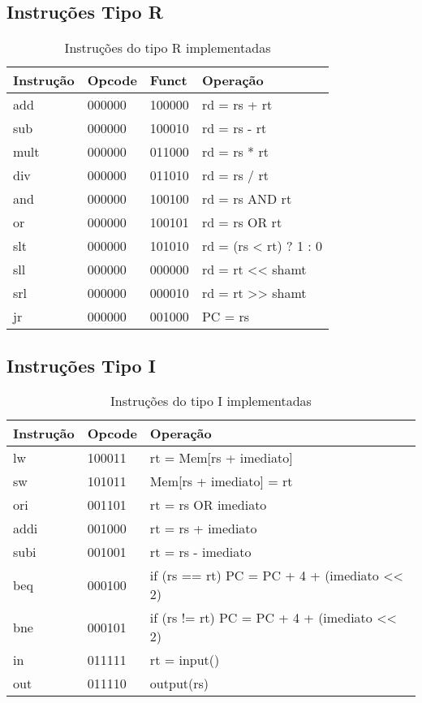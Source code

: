 \documentclass[
	12pt,				%
	oneside,
	a4paper,			%
	english,			%
	french,				%
	spanish,			%
	brazil,				%
	]{abntex2}
\begin{document}
\subsection{Instruções Tipo R}

\begin{table}[H]
\centering
\caption{Instruções do tipo R implementadas}
\begin{tabular}{|l|l|l|l|}
\hline
\textbf{Instrução} & \textbf{Opcode} & \textbf{Funct} & \textbf{Operação} \\
\hline
add & 000000 & 100000 & rd = rs + rt \\
\hline
sub & 000000 & 100010 & rd = rs - rt \\
\hline
mult & 000000 & 011000 & rd = rs * rt \\
\hline
div & 000000 & 011010 & rd = rs / rt \\
\hline
and & 000000 & 100100 & rd = rs AND rt \\
\hline
or & 000000 & 100101 & rd = rs OR rt \\
\hline
slt & 000000 & 101010 & rd = (rs < rt) ? 1 : 0 \\
\hline
sll & 000000 & 000000 & rd = rt << shamt \\
\hline
srl & 000000 & 000010 & rd = rt >> shamt \\
\hline
jr & 000000 & 001000 & PC = rs \\
\hline
\end{tabular}
\end{table}

\subsection{Instruções Tipo I}

\begin{table}[H]
\centering
\caption{Instruções do tipo I implementadas}
\begin{tabular}{|l|l|l|}
\hline
\textbf{Instrução} & \textbf{Opcode} & \textbf{Operação} \\
\hline
lw & 100011 & rt = Mem[rs + imediato] \\
\hline
sw & 101011 & Mem[rs + imediato] = rt \\
\hline
ori & 001101 & rt = rs OR imediato \\
\hline
addi & 001000 & rt = rs + imediato \\
\hline
subi & 001001 & rt = rs - imediato \\
\hline
beq & 000100 & if (rs == rt) PC = PC + 4 + (imediato << 2) \\
\hline
bne & 000101 & if (rs != rt) PC = PC + 4 + (imediato << 2) \\
\hline
in & 011111 & rt = input() \\
\hline
out & 011110 & output(rs) \\
\hline
\end{tabular}
\end{table}
\end{document}

